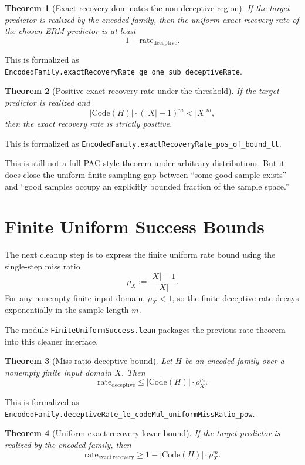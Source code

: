 \documentclass[11pt]{article}
\newtheorem{theorem}{Theorem}[section]
\theoremstyle{remark}
\begin{document}
\begin{theorem}[Exact recovery dominates the non-deceptive region]
If the target predictor is realized by the encoded family, then the uniform exact
recovery rate of the chosen ERM predictor is at least
\[
  1 - \mathrm{rate}_{\mathrm{deceptive}}.
\]
\end{theorem}

\noindent
This is formalized as
\texttt{EncodedFamily.exactRecoveryRate\_ge\_one\_sub\_deceptiveRate}.

\begin{theorem}[Positive exact recovery rate under the threshold]
If the target predictor is realized and
\[
  |\mathrm{Code}(H)| \cdot (|X|-1)^m < |X|^m,
\]
then the exact recovery rate is strictly positive.
\end{theorem}

\noindent
This is formalized as
\texttt{EncodedFamily.exactRecoveryRate\_pos\_of\_bound\_lt}.

This is still not a full PAC-style theorem under arbitrary distributions.  But it
does close the uniform finite-sampling gap between ``some good sample exists'' and
``good samples occupy an explicitly bounded fraction of the sample space.''

\section{Finite Uniform Success Bounds}

The next cleanup step is to express the finite uniform rate bound using the
single-step miss ratio
\[
  \rho_X := \frac{|X|-1}{|X|}.
\]
For any nonempty finite input domain, \(\rho_X < 1\), so the finite deceptive
rate decays exponentially in the sample length \(m\).

The module \texttt{FiniteUniformSuccess.lean} packages the previous rate theorem
into this cleaner interface.

\begin{theorem}[Miss-ratio deceptive bound]
Let \(H\) be an encoded family over a nonempty finite input domain \(X\).  Then
\[
  \mathrm{rate}_{\mathrm{deceptive}}
  \le
  |\mathrm{Code}(H)| \cdot \rho_X^m.
\]
\end{theorem}

\noindent
This is formalized as
\texttt{EncodedFamily.deceptiveRate\_le\_codeMul\_uniformMissRatio\_pow}.

\begin{theorem}[Uniform exact recovery lower bound]
If the target predictor is realized by the encoded family, then
\[
  \mathrm{rate}_{\mathrm{exact\ recovery}}
  \ge
  1 - |\mathrm{Code}(H)| \cdot \rho_X^m.
\]
\end{theorem}
\end{document}
